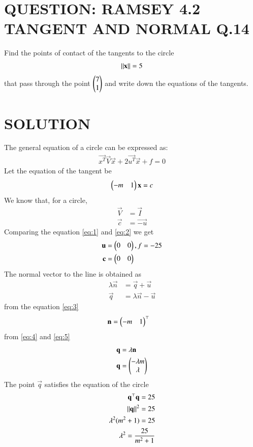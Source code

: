 \documentclass[journal,12pt,twocolumn]{IEEEtran}
\begin{document}
\section{QUESTION: RAMSEY 4.2 TANGENT AND NORMAL Q.14}
 Find the points of contact of the tangents to
the circle
\begin{align}
\lVert\mathbf{x}\rVert=5 \label{eq:1}
\end{align}
that pass through the point $\begin{pmatrix}7 \\ 1\end{pmatrix}$ and write down the equations of the tangents.

\section{SOLUTION}
The general equation of a circle can be expressed as:
\begin{align}
\vec{x^T}\vec{V}\vec{x} + 2\vec{u^T}\vec{x} + f = 0 \label{eq:2}
\end{align}
Let the equation of the tangent be 
\begin{align}
\begin{pmatrix}-m & 1\end{pmatrix}\mathbf{x}=c \label{eq:3}
\end{align}
We know that, for a circle,
\begin{align}
\vec{V} &= \vec{I}\\
\vec{c} &=\vec{-u}
\end{align} 
Comparing the equation \eqref{eq:1} and \eqref{eq:2} we get
\begin{align}
\mathbf{u} &= \begin{pmatrix}0 & 0\end{pmatrix} , f= -25 \label{eq:4}\\
\mathbf{c} &=\begin{pmatrix}0 & 0\end{pmatrix}
\end{align} 
The normal vector to the line is obtained as
\begin{align}
\lambda\vec{n} &= \vec{q} +\vec{u}\\
\vec{q} &=\lambda\vec{n} - \vec{u}
\end{align}
from the equation \eqref{eq:3}
\begin{align}
\mathbf{n} &= \begin{pmatrix}-m & 1\end{pmatrix}^{\top} \label{eq:5}
\end{align} 
from \eqref{eq:4} and \eqref{eq:5}
\begin{align}
\mathbf{q} &=\lambda\mathbf{n}\\
\mathbf{q} &=\begin{pmatrix}-\lambda m \\ \lambda\end{pmatrix}
\end{align}
The point $\vec{q}$ satisfies the equation of the
circle
\begin{align}
\mathbf{q}^{\top}\mathbf{q} = 25\\
\lVert\mathbf{q}\rVert^{2} = 25\\
\lambda^{2}(m^{2} + 1) = 25\\
\lambda^{2} = \dfrac{25}{m^{2} + 1} \label{eq:6}
\end{align}
\end{document}
